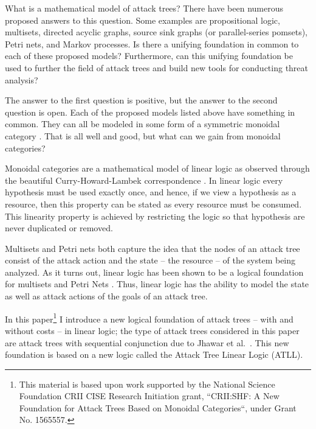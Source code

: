 What is a mathematical model of attack trees?  There have been
numerous proposed answers to this question.  Some examples are
propositional logic, multisets, directed acyclic graphs, source sink
graphs (or parallel-series pomsets), Petri nets, and Markov processes.
Is there a unifying foundation in common to each of these proposed
models?  Furthermore, can this unifying foundation be used to further
the field of attack trees and build new tools for conducting threat
analysis?

The answer to the first question is positive, but the answer to the
second question is open.  Each of the proposed models listed above
have something in common.  They can all be modeled in some form of a
symmetric monoidal category
\cite{Tzouvaras:1998,Brown:1991,Fiore:2013,FrancescoAlbasini2010}.
That is all well and good, but what can we gain from monoidal
categories?

Monoidal categories are a mathematical model of linear logic as
observed through the beautiful Curry-Howard-Lambek correspondence
\cite{Mellies:2009}.  In linear logic every hypothesis must be used
exactly once, and hence, if we view a hypothesis as a resource, then
this property can be stated as every resource must be consumed.  This
linearity property is achieved by restricting the logic so that
hypothesis are never duplicated or removed.

Multisets and Petri nets both capture the idea that the nodes of an
attack tree consist of the attack action and the state -- the
resource -- of the system being analyzed. As it turns out, linear
logic has been shown to be a logical foundation for multisets
\cite{Tzouvaras:1998} and Petri Nets \cite{Brown:1991}.  Thus, linear
logic has the ability to model the state as well as attack actions of
the goals of an attack tree.  

In this paper\footnote{This material is based upon work supported by
  the National Science Foundation CRII CISE Research Initiation grant,
  ``CRII:SHF: A New Foundation for Attack Trees Based on Monoidal
  Categories``, under Grant No. 1565557.} I introduce a new logical
foundation of attack trees -- with and without costs -- in linear
logic; the type of attack trees considered in this paper are attack
trees with sequential conjunction due to Jhawar et
al.~\cite{Jhawar:2015}.  This new foundation is based on a new logic
called the Attack Tree Linear Logic (ATLL).

